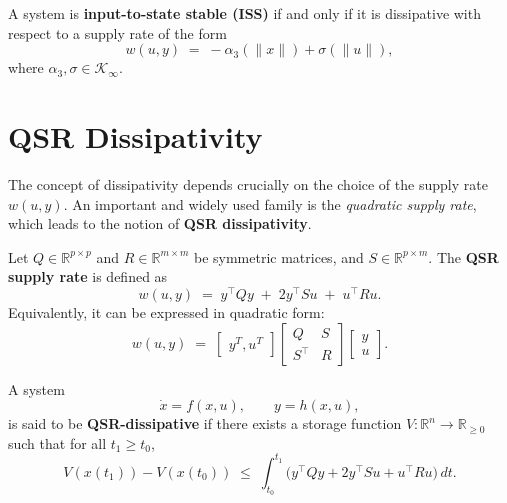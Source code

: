 \begin{proposition}\label{lem:iss_dissipative}
A system is \textbf{input-to-state stable (ISS)} if and only if it is dissipative with 
respect to a supply rate of the form
\[
w(u,y) \;=\; -\alpha_3(\|x\|) + \sigma(\|u\|),
\]
where $\alpha_3, \sigma \in \mathcal{K}_\infty$.
\end{proposition}

\section{QSR Dissipativity}

The concept of dissipativity depends crucially on the choice of the supply rate $w(u,y)$.  
An important and widely used family is the \emph{quadratic supply rate}, which leads to the 
notion of \textbf{QSR dissipativity}.

\begin{definition}\label{def:QSR}
Let $Q \in \mathbb{R}^{p \times p}$ and $R \in \mathbb{R}^{m \times m}$ be symmetric matrices, 
and $S \in \mathbb{R}^{p \times m}$.  
The \textbf{QSR supply rate} is defined as
\begin{equation}\label{eq:QSR_supply}
w(u,y) \;=\; y^\top Q y \;+\; 2 y^\top S u \;+\; u^\top R u .
\end{equation}
Equivalently, it can be expressed in quadratic form:
\begin{equation}\label{eq:QSR_matrix}
w(u,y) \;=\; 
\begin{bmatrix} y^T,  u^T \end{bmatrix}
\begin{bmatrix} Q & S \\[3pt] S^\top & R \end{bmatrix}
\begin{bmatrix} y \\[3pt] u \end{bmatrix}.
\end{equation}
\end{definition}

\begin{definition}\label{def:QSR_dissipative}
A system 
\begin{equation}
\dot{x} = f(x,u), \qquad y = h(x,u),
\end{equation}
is said to be \textbf{QSR-dissipative} if there exists a storage function 
$V : \mathbb{R}^n \to \mathbb{R}_{\ge 0}$ such that for all $t_1 \ge t_0$,
\begin{equation}\label{eq:QSR_dissipation}
V(x(t_1)) - V(x(t_0)) 
\;\le\; \int_{t_0}^{t_1} \! \big( y^\top Q y + 2 y^\top S u + u^\top R u \big)\, dt .
\end{equation}
\end{definition}

